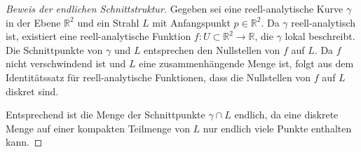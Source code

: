 \begin{proof}[Beweis der endlichen Schnittstruktur\label{jordan:proof:endliche_schnittstruktur}]

    Gegeben sei eine reell-analytische Kurve $\gamma$ in der Ebene $\mathbb{R}^2$ und ein Strahl $L$ mit Anfangspunkt $p \in \mathbb{R}^2$. 
    Da $\gamma$ reell-analytisch ist, existiert eine reell-analytische Funktion $f: U \subset \mathbb{R}^2 \to \mathbb{R}$, die $\gamma$ lokal beschreibt. 
    Die Schnittpunkte von $\gamma$ und $L$ entsprechen den Nullstellen von $f$ auf $L$. 
    Da $f$ nicht verschwindend ist und $L$ eine zusammenhängende Menge ist, folgt aus dem Identitätssatz für reell-analytische Funktionen, dass die Nullstellen von $f$ auf $L$ diskret sind. 

    Entsprechend ist die Menge der Schnittpunkte $\gamma \cap L$ endlich, da eine diskrete Menge auf einer kompakten Teilmenge von $L$ nur endlich viele Punkte enthalten kann.
\end{proof}